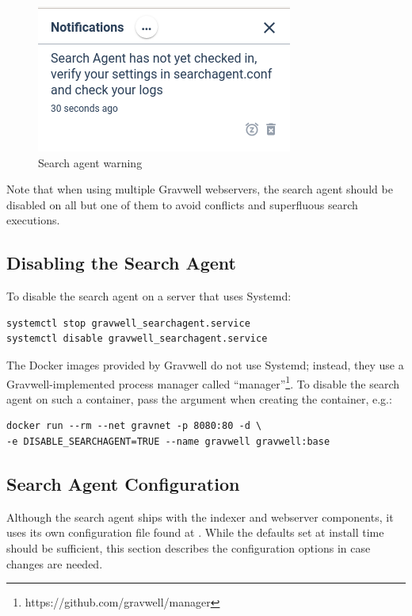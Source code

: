 \begin{figure}
	\includegraphics[width=0.4\linewidth]{images/searchagent-warn.png}
	\caption{Search agent warning}
	\label{fig:searchagent-warn}
\end{figure}

Note that when using multiple Gravwell webservers, the search agent
should be disabled on all but one of them to avoid conflicts and
superfluous search executions.

\subsection{Disabling the Search Agent}

To disable the search agent on a server that uses Systemd:

\begin{Verbatim}[breaklines=true]
systemctl stop gravwell_searchagent.service
systemctl disable gravwell_searchagent.service
\end{Verbatim}

The Docker images provided by Gravwell do not use Systemd; instead,
they use a Gravwell-implemented process manager called ``manager''\footnote{https://github.com/gravwell/manager}. To disable the search agent on such a
container, pass the argument  when
creating the container, e.g.:

\begin{Verbatim}[breaklines=true]
docker run --rm --net gravnet -p 8080:80 -d \
-e DISABLE_SEARCHAGENT=TRUE --name gravwell gravwell:base
\end{Verbatim}

\subsection{Search Agent Configuration}

Although the search agent ships with the indexer and webserver
components, it uses its own configuration file found at
. While the defaults set at
install time should be sufficient, this section describes the
configuration options in case changes are needed.

